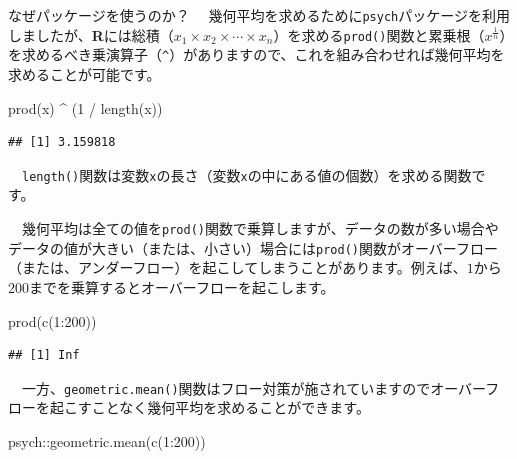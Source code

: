 \documentclass[
  12pt,
]{book}
\newenvironment{Shaded}{\begin{snugshade}}{\end{snugshade}}
\newcommand{\DecValTok}[1]{\textcolor[rgb]{0.00,0.00,0.81}{#1}}
\newcommand{\FunctionTok}[1]{\textcolor[rgb]{0.00,0.00,0.00}{#1}}
\newcommand{\NormalTok}[1]{#1}
\newcommand{\SpecialCharTok}[1]{\textcolor[rgb]{0.00,0.00,0.00}{#1}}
\begin{document}
\begin{info-box}{なぜパッケージを使うのか？}
　幾何平均を求めるために\texttt{psych}パッケージを利用しましたが、\textbf{R}には総積（\(x_1 \times x_2 \times \cdots \times x_n\)）を求める\texttt{prod()}関数と累乗根（\(x^{\frac{1}{n}}\)）を求めるべき乗演算子（\texttt{\^{}}）がありますので、これを組み合わせれば幾何平均を求めることが可能です。

\begin{Shaded}
\begin{Highlighting}[numbers=left,,]
\FunctionTok{prod}\NormalTok{(x) }\SpecialCharTok{\^{}}\NormalTok{ (}\DecValTok{1} \SpecialCharTok{/} \FunctionTok{length}\NormalTok{(x))}
\end{Highlighting}
\end{Shaded}

\begin{verbatim}
## [1] 3.159818
\end{verbatim}

　\texttt{length()}関数は変数\texttt{x}の長さ（変数\texttt{x}の中にある値の個数）を求める関数です。

　幾何平均は全ての値を\texttt{prod()}関数で乗算しますが、データの数が多い場合やデータの値が大きい（または、小さい）場合には\texttt{prod()}関数がオーバーフロー（または、アンダーフロー）を起こしてしまうことがあります。例えば、\(1\)から\(200\)までを乗算するとオーバーフローを起こします。

\begin{Shaded}
\begin{Highlighting}[numbers=left,,]
\FunctionTok{prod}\NormalTok{(}\FunctionTok{c}\NormalTok{(}\DecValTok{1}\SpecialCharTok{:}\DecValTok{200}\NormalTok{))}
\end{Highlighting}
\end{Shaded}

\begin{verbatim}
## [1] Inf
\end{verbatim}

　一方、\texttt{geometric.mean()}関数はフロー対策が施されていますのでオーバーフローを起こすことなく幾何平均を求めることができます。

\begin{Shaded}
\begin{Highlighting}[numbers=left,,]
\NormalTok{psych}\SpecialCharTok{::}\FunctionTok{geometric.mean}\NormalTok{(}\FunctionTok{c}\NormalTok{(}\DecValTok{1}\SpecialCharTok{:}\DecValTok{200}\NormalTok{))}
\end{Highlighting}
\end{Shaded}


\end{info-box}
\end{document}

